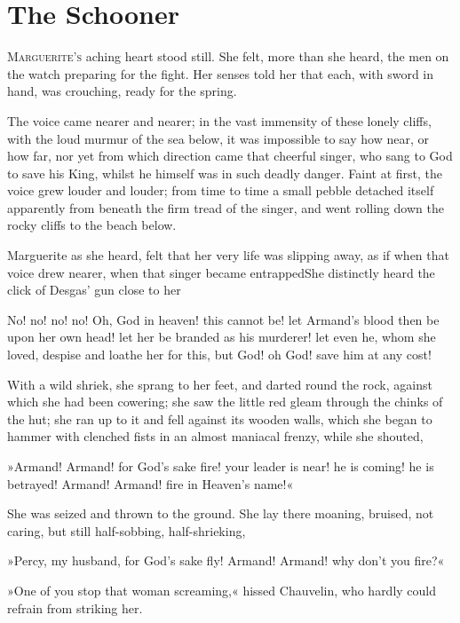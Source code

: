
\chapter{The Schooner}
\lettrine[lines=4]{M}{arguerite's} aching heart stood still. She felt, more than she heard, the men on the watch preparing for the fight. Her senses told her that each, with sword in hand, was crouching, ready for the spring.

The voice came nearer and nearer; in the vast immensity of these lonely cliffs, with the loud murmur of the sea below, it was impossible to say how near, or how far, nor yet from which direction came that cheerful singer, who sang to God to save his King, whilst he himself was in such deadly danger. Faint at first, the voice grew louder and louder; from time to time a small pebble detached itself apparently from beneath the firm tread of the singer, and went rolling down the rocky cliffs to the beach below.

Marguerite as she heard, felt that her very life was slipping away, as if when that voice drew nearer, when that singer became entrapped\textellipsis \allowbreak  She distinctly heard the click of Desgas' gun close to her\textellipsis \allowbreak 

No! no! no! no! Oh, God in heaven! this cannot be! let Armand's blood then be upon her own head! let her be branded as his murderer! let even he, whom she loved, despise and loathe her for this, but God! oh God! save him at any cost!

With a wild shriek, she sprang to her feet, and darted round the rock, against which she had been cowering; she saw the little red gleam through the chinks of the hut; she ran up to it and fell against its wooden walls, which she began to hammer with clenched fists in an almost maniacal frenzy, while she shouted,\longdash


»Armand! Armand! for God's sake fire! your leader is near! he is coming! he is betrayed! Armand! Armand! fire in Heaven's name!«

She was seized and thrown to the ground. She lay there moaning, bruised, not caring, but still half-sobbing, half-shrieking,\longdash


»Percy, my husband, for God's sake fly! Armand! Armand! why don't you fire?«

»One of you stop that woman screaming,« hissed Chauvelin, who hardly could refrain from striking her.

